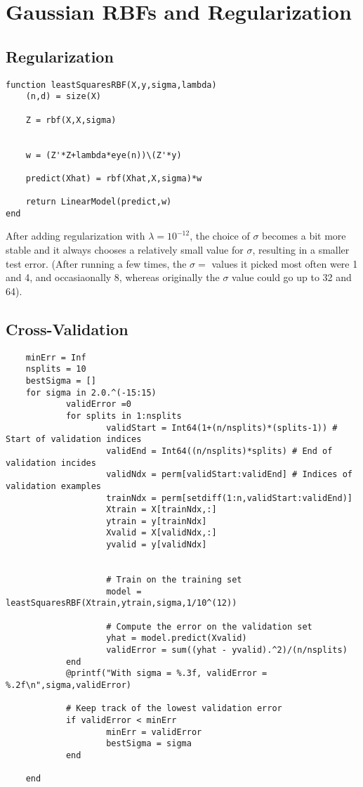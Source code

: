\documentclass{article}
\begin{document}
\section{Gaussian RBFs and Regularization}

\subsection{Regularization}

\begin{verbatim}
function leastSquaresRBF(X,y,sigma,lambda)
    (n,d) = size(X)

    Z = rbf(X,X,sigma)


    w = (Z'*Z+lambda*eye(n))\(Z'*y)

    predict(Xhat) = rbf(Xhat,X,sigma)*w

    return LinearModel(predict,w)
end
\end{verbatim}

After adding regularization with $\lambda = 10^{-12}$, the choice of $\sigma$ becomes a bit more stable and it always chooses a relatively small value for $\sigma$, resulting in a smaller test error. (After running a few times, the $\sigma =$ values it picked most often were 1 and 4, and occasiaonally 8, whereas originally the $\sigma$ value could go up to 32 and 64).

\subsection{Cross-Validation}

\begin{verbatim}
    minErr = Inf
    nsplits = 10
    bestSigma = []
    for sigma in 2.0.^(-15:15)
            validError =0
            for splits in 1:nsplits
                    validStart = Int64(1+(n/nsplits)*(splits-1)) # Start of validation indices
                    validEnd = Int64((n/nsplits)*splits) # End of validation incides
                    validNdx = perm[validStart:validEnd] # Indices of validation examples
                    trainNdx = perm[setdiff(1:n,validStart:validEnd)]
                    Xtrain = X[trainNdx,:]
                    ytrain = y[trainNdx]
                    Xvalid = X[validNdx,:]
                    yvalid = y[validNdx]
    
    
                    # Train on the training set
                    model = leastSquaresRBF(Xtrain,ytrain,sigma,1/10^(12))
    
                    # Compute the error on the validation set
                    yhat = model.predict(Xvalid)
                    validError = sum((yhat - yvalid).^2)/(n/nsplits)
            end
            @printf("With sigma = %.3f, validError = %.2f\n",sigma,validError)
    
            # Keep track of the lowest validation error
            if validError < minErr
                    minErr = validError
                    bestSigma = sigma
            end
    
    end
\end{verbatim}
\end{document}
